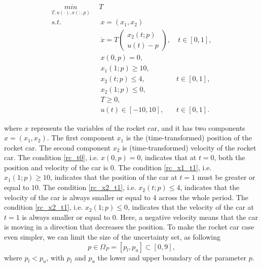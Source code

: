 \documentclass  [
  paper    = a4,
  BCOR     = 10mm,
  twoside,
  fontsize = 12pt,
  fleqn,
  toc      = bibnumbered,
  toc      = listofnumbered,
  numbers  = noendperiod,
  headings = normal,
  listof   = leveldown,
  version  = 3.03
]                                       {scrreprt}
\newcommand{\<}{\langle}
\renewcommand{\>}{\rangle}
\begin{document}
   
   
   \begin{subequations}
   	\begin{align}
   	\underset{T, u(\cdot), x(:,p)}{min} \   & \  T \\ 
   	s.t.  & \ \ x = (x_1, x_2)   \label{rc_x} \\ 
   	& \ \  \dot{x} = T  \begin{pmatrix}  x_2(t;p) \\ u(t)-p   \end{pmatrix}, & \ t \in [0,1],  \label{rc_partial} \\
   	& \ \ x(0,p) = 0, \label{rc_t0}\\
   	& \ \ x_1(1;p) \geq 10, \label{rc_x1_t1} \\
   	& \ \ x_2(t;p) \leq 4, & t \in [0,1], \label{rc_x2_tc} \\
   	& \ \ x_2(1;p) \leq 0, \label{rc_x2_t1}  \\
   	& \ \ T \geq 0, \\
   	& \ \ u(t) \in [-10, 10], & t \in [0,1]. 
   	\end{align}
   	\label{rc}
   \end{subequations}
   
   where $x$ represents the variables of the rocket car, and it has two components $ x = (x_1, x_2)$. The first component $x_1$ is the (time-transformed) position of the rocket car. The second component $x_2$ is (time-transformed) velocity of the rocket car. The condition \ref{rc_t0}, i.e. $x(0,p) = 0$, indicates that at $t=0$, both the position and velocity of the car is $0$. The condition \ref{rc_x1_t1}, i.e. $x_1(1;p) \geq 10$, indicates that the position of the car at $t=1$ must be greater or equal to $10$. The condition \ref{rc_x2_t1}, i.e. $x_2(t;p) \leq 4$, indicates that the velocity of the car is always smaller or equal to 4 across the whole period. The condition \ref{rc_x2_t1}, i.e. $x_2(1;p) \leq 0$, indicates that the velocity of the car at $t=1$ is always smaller or equal to $0$. Here, a negative velocity means that the car is moving in a direction that decreases the position. To make the rocket car case even simpler, we can limit the size of the uncertainty set, as following
   \begin{equation}
   p \in \Omega_P = [p_l, p_u] \subset [0,9],
   \end{equation}
   where $p_l < p_u$, with $p_l$ and $p_u$ the lower and upper boundary of the parameter $p$.  
   
\end{document}
